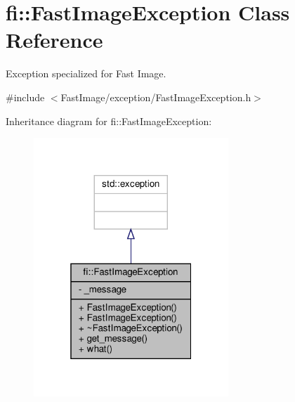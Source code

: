 \hypertarget{classfi_1_1FastImageException}{}\section{fi\+:\+:Fast\+Image\+Exception Class Reference}
\label{classfi_1_1FastImageException}


Exception specialized for Fast Image.  




{\ttfamily \#include $<$Fast\+Image/exception/\+Fast\+Image\+Exception.\+h$>$}



Inheritance diagram for fi\+:\+:Fast\+Image\+Exception\+:
\nopagebreak
\begin{figure}[H]
\begin{center}
\leavevmode
\includegraphics[width=208pt]{d2/df2/classfi_1_1FastImageException__inherit__graph}
\end{center}
\end{figure}



